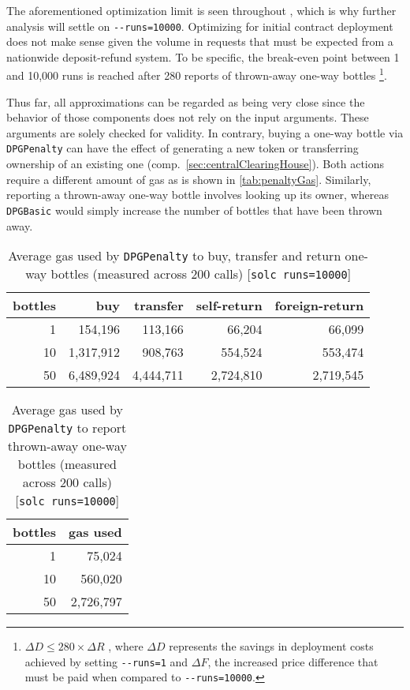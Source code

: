 \begin{appendices}
\FloatBarrier

The aforementioned optimization limit is seen throughout , which is why further analysis will settle on \texttt{-{}-runs=10000}. Optimizing for initial contract deployment does not make sense given the volume in requests that must be expected from a nationwide deposit-refund system. To be specific, the break-even point between 1 and 10,000 runs is reached after 280 reports of thrown-away one-way bottles \footnote{$ \Delta D \leq 280 \times \Delta R$ , where $\Delta D$ represents the savings in deployment costs achieved by setting \texttt{-{}-runs=1} and $\Delta F$, the increased price difference that must be paid when compared to \texttt{-{}-runs=10000}.}. 

Thus far, all approximations can be regarded as being very close since the behavior of those components does not rely on the input arguments. These arguments are solely checked for validity. In contrary, buying a one-way bottle via \texttt{DPGPenalty} can have the effect of generating a new token or transferring ownership of an existing one (comp.~\ref{sec:centralClearingHouse}). Both actions require a different amount of gas as is shown in \autoref{tab:penaltyGas}. Similarly, reporting a thrown-away one-way bottle involves looking up its owner, whereas \texttt{DPGBasic} would simply increase the number of bottles that have been thrown away.

\begin{table}[hbt]
	\centering	
	\begin{tabular}{r|r|r|r|r}
    	bottles & buy & transfer & self-return & foreign-return \\
    	\hline
    	1 & 154,196 & 113,166 & 66,204 & 66,099 \\
    	10 & 1,317,912 & 908,763 & 554,524 & 553,474 \\ 
    	50 & 6,489,924 & 4,444,711 & 2,724,810 & 2,719,545 \\
	\end{tabular}
	\caption[Gas used to buy, transfer and return one-way bottles]{Average gas used by \texttt{DPGPenalty} to buy, transfer and return one-way bottles (measured across 200 calls) [\texttt{solc runs=10000}]}
	\label{tab:penaltyGas}
\end{table}

\begin{table}[hbt]
	\centering	
	\begin{tabular}{r|r}
    	bottles & gas used \\
    	\hline
    	1 & 75,024 \\
    	10 & 560,020 \\ 
    	50 & 2,726,797 \\
	\end{tabular}
	\caption[Gas used to report thrown-away one-way bottles]{Average gas used by \texttt{DPGPenalty} to report thrown-away one-way bottles (measured across 200 calls) [\texttt{solc runs=10000}]}
	\label{tab:penaltyGas}
\end{table}


\end{appendices}
